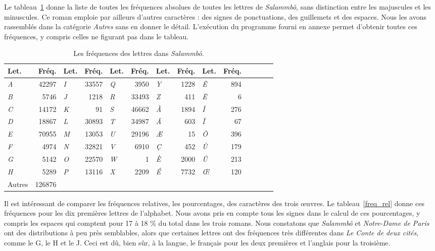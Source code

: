 \documentclass[]{article}
\begin{document}
Le tableau~\ref{freq_salammbo} donne la liste de toutes les fréquences absolues de toutes les lettres de \textit{Salammbô}, sans distinction entre les majuscules et les minuscules. Ce roman emploie par ailleurs d'autres caractères : des signes de ponctuations, des guillemets et des espaces. Nous les avons rassemblés dans la catégorie \textit{Autres} sans en donner le détail. L'exécution du programme fourni en annexe permet d'obtenir toutes ces fréquences, y compris celles ne figurant pas dans le tableau.

\begin{table}[t]
\caption{Les fréquences des lettres dans \textit{Salammbô}.}
\begin{center}\begin{tabular}{lrlrlrlrlrlrlr}
\hline
Let. & Fréq. & Let. & Fréq. &Let. & Fréq. & Let. & Fréq. & Let. & Fréq.\\
\hline
\textit{A} & 42297& \textit{I} & 33557&\textit{Q}& 3950&\textit{Y}&1228&\textit{Ê}&894\\
\textit{B}& 5746 & \textit{J}& 1218&\textit{R}&33493 &\textit{Z}&411&\textit{Ë}&6\\
\textit{C} & 14172 & \textit{K}& 91&\textit{S}&46662&\textit{À}&1894&\textit{Î}&276\\
\textit{D}& 18867 & \textit{L}& 30893 & \textit{T}& 34987&\textit{Â}&603&\textit{Ï}&67\\
\textit{E} & 70955&\textit{M} &13053 &\textit{U}&29196&\textit{Æ}&15&\textit{Ô}&396\\
\textit{F} & 4974 &\textit{N} & 32821 &\textit{V}&6910&\textit{Ç}&452&\textit{Ù}&179\\
 \textit{G} & 5142 &\textit{O} &22570& \textit{W}&1&\textit{È}&2000&\textit{Û}&213\\
 \textit{H} & 5289 & \textit{P} &13116 &\textit{X}&2209&\textit{É}&7732&\textit{Œ}&120\\
Autres&126876\\
\hline
\end{tabular} 
\label{freq_salammbo}
\end{center}
\end{table}

Il est intéressant de comparer les fréquences relatives, les pourcentages, des caractères des trois œuvres. Le tableau~\ref{freq_rel} donne ces fréquences pour les dix premières lettres de l'alphabet. Nous avons pris en compte tous les signes dans le calcul de ces pourcentages, y compris les espaces qui comptent pour 17 à 18 \% du total dans les trois romans. Nous constatons que \textit{Salammbô} et \textit{Notre-Dame de Paris} ont des distributions à peu près semblables, alors que certaines lettres ont des fréquences très différentes dans \textit{Le Conte de deux cités}, comme le G, le H et le J. Ceci est dû, bien sûr, à la langue, le français pour les deux premières et l'anglais pour la troisième.
\end{document}
